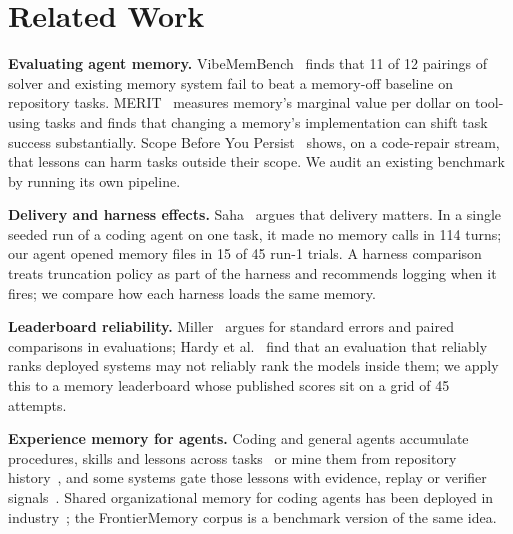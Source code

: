 \section{Related Work}
\label{sec:related}
\textbf{Evaluating agent memory.}
VibeMemBench~\cite{vibemembench} finds that 11 of 12 pairings of solver and existing memory system fail to beat a memory-off baseline on repository tasks.
MERIT~\cite{merit} measures memory's marginal value per dollar on tool-using tasks and finds that changing a memory's implementation can shift task success substantially.
Scope Before You Persist~\cite{scopebefore} shows, on a code-repair stream, that lessons can harm tasks outside their scope.
We audit an existing benchmark by running its own pipeline.

\textbf{Delivery and harness effects.}
Saha~\cite{deliverynotstorage} argues that delivery matters. In a single seeded run of a coding agent on one task, it made no memory calls in 114 turns; our agent opened memory files in 15 of 45 run-1 trials.
A harness comparison~\cite{harnessormodel} treats truncation policy as part of the harness and recommends logging when it fires; we compare how each harness loads the same memory.

\textbf{Leaderboard reliability.}
Miller~\cite{errorbars} argues for standard errors and paired comparisons in evaluations; Hardy et al.~\cite{agentreliability} find that an evaluation that reliably ranks deployed systems may not reliably rank the models inside them; we apply this to a memory leaderboard whose published scores sit on a grid of 45 attempts.

\textbf{Experience memory for agents.}
Coding and general agents accumulate procedures, skills and lessons across tasks~\cite{survey-selfevolving,sepm} or mine them from repository history~\cite{chronos}, and some systems gate those lessons with evidence, replay or verifier signals~\cite{grounding-memory,memguard,sedm,aecg}.
Shared organizational memory for coding agents has been deployed in industry~\cite{enterprise-memory}; the FrontierMemory corpus is a benchmark version of the same idea.

